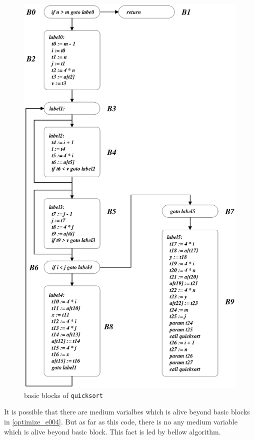 \begin{figure}[htbp]
\begin{center}
\includegraphics[width=1.01\linewidth,height=1.75\linewidth]{quicksort.eps}
\caption{basic blocks of {\tt{quicksort}}}
\label{optimize_e002}
\end{center}
\end{figure}
It is possible that there are medium varialbes which is alive beyond
basic blocks in \ref{optimize_e004}. But as far as this code, there is
no any medium variable which is alive beyond basic block.
This fact is led by bellow algorithm.

